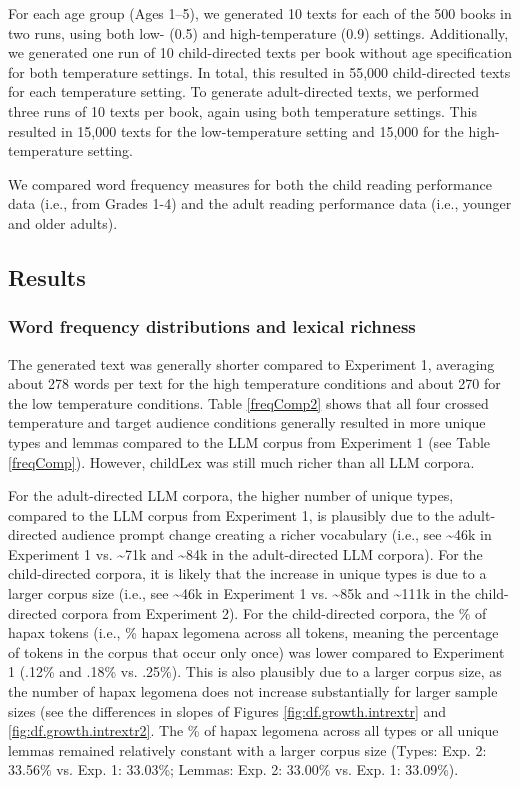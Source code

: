 \documentclass[manuscript]{stjour}
\begin{document}
For each age group (Ages 1--5), we generated 10 texts for each of the 500 books in two runs, using both low- (0.5) and high-temperature (0.9) settings. Additionally, we generated one run of 10 child-directed texts per book without age specification for both temperature settings. In total, this resulted in 55,000 child-directed texts for each temperature setting. To generate adult-directed texts, we performed three runs of 10 texts per book, again using both temperature settings. This resulted in 15,000 texts for the low-temperature setting and 15,000 for the high-temperature setting. 

We compared word frequency measures for both the child reading performance data (i.e., from Grades 1-4) and the adult reading performance data (i.e., younger and older adults). 


\subsection{Results}

\subsubsection*{Word frequency distributions and lexical richness}

The generated text was generally shorter compared to Experiment 1, averaging about 278 words per text for the high temperature conditions and about 270 for the low temperature conditions. Table \ref{freqComp2} shows that all four crossed temperature and target audience conditions generally resulted in more unique types and lemmas compared to the LLM corpus from Experiment 1 (see Table \ref{freqComp}). However, childLex was still much richer than all LLM corpora. 

For the adult-directed LLM corpora, the higher number of unique types, compared to the LLM corpus from Experiment 1, is plausibly due to the adult-directed audience prompt change creating a richer vocabulary (i.e., see \textasciitilde 46k in Experiment 1 vs. \textasciitilde 71k and \textasciitilde 84k in the adult-directed LLM corpora). For the child-directed corpora, it is likely that the increase in unique types is due to a larger corpus size (i.e., see \textasciitilde 46k in Experiment 1 vs. \textasciitilde 85k and \textasciitilde 111k in the child-directed corpora from Experiment 2). For the child-directed corpora, the \% of hapax tokens (i.e., \% hapax legomena across all tokens, meaning the percentage of tokens in the corpus that occur only once) was lower compared to Experiment 1 (.12\% and .18\% vs. .25\%). This is also plausibly due to a larger corpus size, as the number of hapax legomena does not increase substantially for larger sample sizes (see the differences in slopes of Figures \ref{fig:df.growth.intrextr} and \ref{fig:df.growth.intrextr2}. The \% of hapax legomena across all types or all unique lemmas remained relatively constant with a larger corpus size (Types: Exp. 2: 33.56\% vs. Exp. 1: 33.03\%; Lemmas: Exp. 2: 33.00\% vs. Exp. 1: 33.09\%). 
\end{document}
